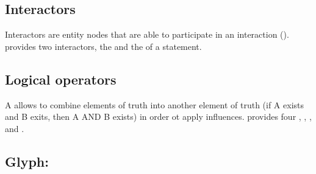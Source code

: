 \subsection{Interactors}\label{sec:interactors}

Interactors are entity nodes that are able to participate in an interaction (). \SBGNERLone{} provides two interactors, the  and the  of a statement.





\subsection{Logical operators}\label{sec:logic}

A  allows to combine elements of truth into another element of truth (if A exists and B exits, then A AND B exists) in order ot apply influences. \SBGNERLone{} provides four , , ,  and .







\subsection{Glyph: }\label{sec:perturbation}



